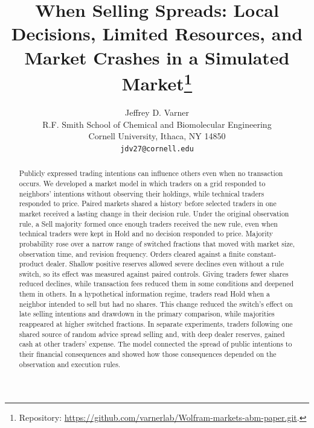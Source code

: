 \documentclass{article}
\title{When Selling Spreads: Local Decisions, Limited Resources, and Market Crashes in a Simulated Market\thanks{Repository: \url{https://github.com/varnerlab/Wolfram-markets-abm-paper.git}.}}
\author{%
  Jeffrey D. Varner \\
  R.F. Smith School of Chemical and Biomolecular Engineering\\
  Cornell University, Ithaca, NY 14850 \\
  \texttt{jdv27@cornell.edu} \\
}
\theoremstyle{definition}
\theoremstyle{remark}
\begin{document}
\raggedbottom

\maketitle

\begin{abstract}
Publicly expressed trading intentions can influence others even when no
transaction occurs. We developed a market model in which traders on a
grid responded to neighbors' intentions without observing their holdings,
while technical traders responded to price. Paired markets shared a
history before selected traders in one market received a lasting change
in their decision rule. Under the original observation rule, a Sell
majority formed once enough traders received the new rule, even when
technical traders were kept in Hold and no decision responded to price.
Majority probability rose over a narrow range of switched fractions that
moved with market size, observation time, and revision frequency. Orders
cleared against a finite constant-product dealer. Shallow positive
reserves allowed severe declines even without a rule switch, so its
effect was measured against paired controls. Giving traders fewer shares
reduced declines, while transaction fees reduced them in some conditions
and deepened them in others. In a hypothetical information regime,
traders read Hold when a neighbor intended to sell but had no shares.
This change reduced the switch's effect on late selling intentions and
drawdown in the primary comparison, while majorities reappeared at higher
switched fractions. In separate experiments, traders following one shared
source of random advice spread selling and, with deep dealer reserves,
gained cash at other traders' expense. The model connected the spread of
public intentions to their financial consequences and showed how those
consequences depended on the observation and execution rules.
\end{abstract}












\end{document}
